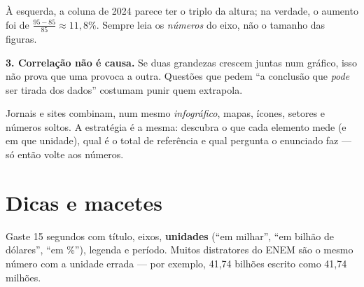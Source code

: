 \begin{center}
\end{center}

À esquerda, a coluna de 2024 parece ter o triplo da altura; na verdade, o
aumento foi de $\frac{95-85}{85}\approx 11{,}8\%$. Sempre leia os
\emph{números} do eixo, não o tamanho das figuras.

\textbf{3. Correlação não é causa.} Se duas grandezas crescem juntas num gráfico,
isso não prova que uma provoca a outra. Questões que pedem “a conclusão que
\emph{pode} ser tirada dos dados” costumam punir quem extrapola.

\begin{contexto}[Infográficos]
Jornais e sites combinam, num mesmo \emph{infográfico}, mapas, ícones, setores
e números soltos. A estratégia é a mesma: descubra o que cada elemento mede
(e em que unidade), qual é o total de referência e qual pergunta o enunciado
faz — só então volte aos números.
\end{contexto}

\section{Dicas e macetes}

\begin{dica}
Gaste 15 segundos com título, eixos, \textbf{unidades} (“em milhar”, “em bilhão
de dólares”, “em \%”), legenda e período. Muitos distratores do ENEM são o
mesmo número com a unidade errada — por exemplo, 41,74 bilhões escrito como
41,74 milhões.
\end{dica}

